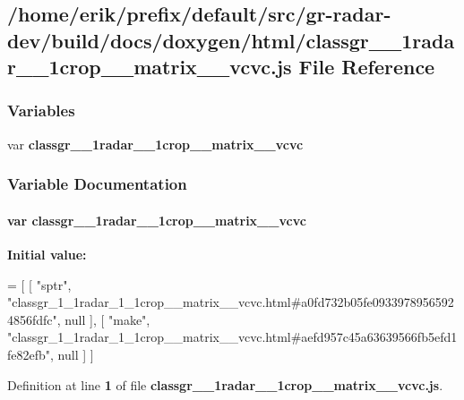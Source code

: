 \subsection{/home/erik/prefix/default/src/gr-\/radar-\/dev/build/docs/doxygen/html/classgr\+\_\+\_\+1radar\+\_\+\_\+1crop\+\_\+\+\_\+matrix\+\_\+\+\_\+vcvc.js File Reference}
\label{classgr__1__1radar__1__1crop____matrix____vcvc_8js}
\subsubsection*{Variables}
\begin{DoxyCompactItemize}
\item 
var {\bf classgr\+\_\+\_\+1radar\+\_\+\_\+1crop\+\_\+\+\_\+matrix\+\_\+\+\_\+vcvc}
\end{DoxyCompactItemize}


\subsubsection{Variable Documentation}
\paragraph[{classgr\+\_\+1\+\_\+1radar\+\_\+1\+\_\+1crop\+\_\+\+\_\+matrix\+\_\+\+\_\+vcvc}]{\setlength{\rightskip}{0pt plus 5cm}var classgr\+\_\+\_\+1radar\+\_\+\_\+1crop\+\_\+\+\_\+matrix\+\_\+\+\_\+vcvc}\label{classgr__1__1radar__1__1crop____matrix____vcvc_8js_a9a671ea68aceae6bb675f0d04a5580a9}
{\bfseries Initial value\+:}
\begin{DoxyCode}
=
[
    [ \textcolor{stringliteral}{"sptr"}, \textcolor{stringliteral}{"classgr\_1\_1radar\_1\_1crop\_\_matrix\_\_vcvc.html#a0fd732b05fe09339789565924856fdfc"}, null ],
    [ \textcolor{stringliteral}{"make"}, \textcolor{stringliteral}{"classgr\_1\_1radar\_1\_1crop\_\_matrix\_\_vcvc.html#aefd957c45a63639566fb5efd1fe82efb"}, null ]
]
\end{DoxyCode}


Definition at line {\bf 1} of file {\bf classgr\+\_\+\_\+1radar\+\_\+\_\+1crop\+\_\+\+\_\+matrix\+\_\+\+\_\+vcvc.\+js}.

